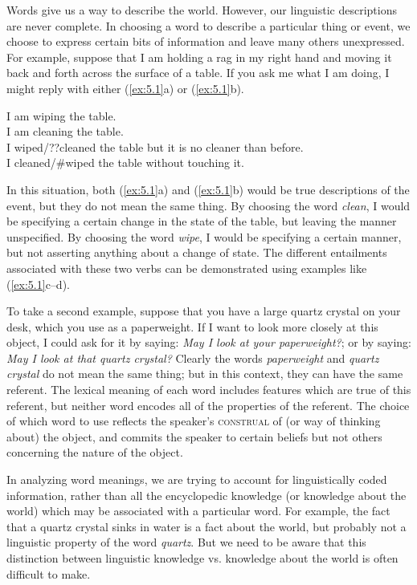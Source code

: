 Words give us a way to describe the world. However, our linguistic descriptions are never complete. In choosing a word to describe a particular thing or event, we choose to express certain bits of information and leave many others unexpressed. For example, suppose that I am holding a rag in my right hand and moving it back and forth across the surface of a table. If you ask me what I am doing, I might reply with either (\ref{ex:5.1}a) or (\ref{ex:5.1}b).


\ea \label{ex:5.1}
\ea I am wiping the table.\\
\ex I am cleaning the table.\\
\ex I wiped/??cleaned the table but it is no cleaner than before.\\
\ex I cleaned/\#wiped the table without touching it.
                       \z
\z


In this situation, both (\ref{ex:5.1}a) and (\ref{ex:5.1}b) would be true descriptions of the event, but they do not mean the same thing. By choosing the word \textit{clean}, I would be specifying a certain change in the state of the table, but leaving the manner unspecified. By choosing the word \textit{wipe}, I would be specifying a certain manner, but not asserting anything about a change of state. The different entailments associated with these two verbs can be demonstrated using examples like (\ref{ex:5.1}c--d).



To take a second example, suppose that you have a large quartz crystal on your desk, which you use as a paperweight. If I want to look more closely at this object, I could ask for it by saying: \textit{May I look at your paperweight?}; or by saying: \textit{May I look at that quartz crystal?} Clearly the words \textit{paperweight} and \textit{quartz crystal} do not mean the same thing; but in this context, they can have the same referent. The lexical meaning of each word includes features which are true of this referent, but neither word encodes all of the properties of the referent. The choice of which word to use reflects the speaker’s \textsc{construal} of (or way of thinking about) the object, and commits the speaker to certain beliefs but not others concerning the nature of the object.



In analyzing word meanings, we are trying to account for linguistically coded information, rather than all the encyclopedic knowledge (or knowledge about the world) which may be associated with a particular word. For example, the fact that a quartz crystal sinks in water is a fact about the world, but probably not a linguistic property of the word \textit{quartz}. But we need to be aware that this distinction between linguistic knowledge vs. knowledge about the world is often difficult to make.


